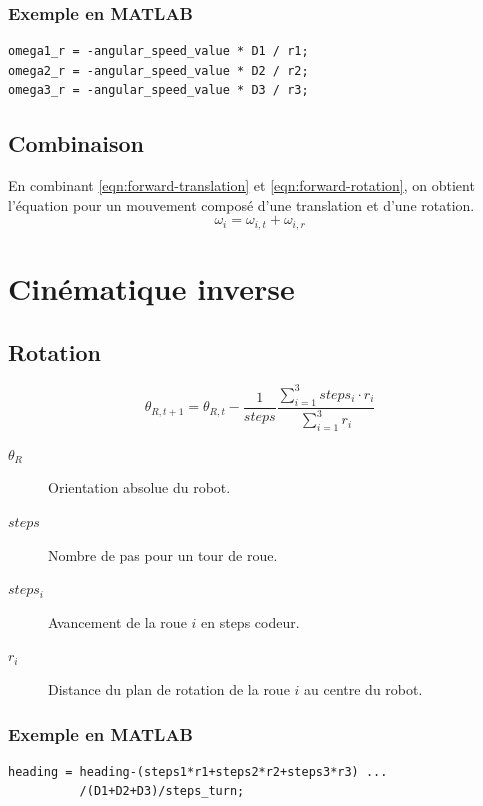 \documentclass[a4paper]{paper}
\begin{document}
\subsubsection{Exemple en MATLAB}
\begin{lstlisting}
omega1_r = -angular_speed_value * D1 / r1;
omega2_r = -angular_speed_value * D2 / r2;
omega3_r = -angular_speed_value * D3 / r3;
\end{lstlisting}

\subsection{Combinaison}
En combinant \eqref{eqn:forward-translation} et \eqref{eqn:forward-rotation}, on obtient l'équation
pour un mouvement composé d'une translation et d'une rotation.
\begin{equation}
    \omega_i = \omega_{i,t} + \omega_{i,r}
    \label{eqn-forward-complete}
\end{equation}
\section{Cinématique inverse}
\subsection{Rotation}
\begin{equation}
    \theta_{R, t+1} = \theta_{R, t} - \frac{1}{steps} \frac{\sum\limits_{i=1}^3 steps_i \cdot r_i}{\sum\limits_{i=1}^3 r_i}
    \label{eqn:reverse-heading}
\end{equation}
\begin{description}
    \item[$\theta_R$] Orientation absolue du robot.
    \item[$steps$] Nombre de pas pour un tour de roue.
    \item[$steps_i$] Avancement de la roue $i$ en steps codeur.
    \item[$r_i$] Distance du plan de rotation de la roue $i$ au centre du robot.
\end{description}

\subsubsection{Exemple en MATLAB}
\begin{lstlisting}
heading = heading-(steps1*r1+steps2*r2+steps3*r3) ...
          /(D1+D2+D3)/steps_turn;
\end{lstlisting}
\end{document}
